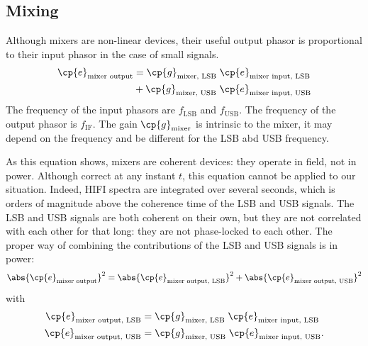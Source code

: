 
\subsection{Mixing}
Although mixers are non-linear devices, their useful output phasor is proportional to their input phasor in the case of small signals.
\begin{equation}
    \begin{aligned}
    \cp{e}_\text{mixer output}
    &=
    \cp{g}_\text{mixer, LSB} \;
    \cp{e}_\text{mixer input, LSB} \\
    &+
    \cp{g}_\text{mixer, USB} \;
    \cp{e}_\text{mixer input, USB}
    \end{aligned}
\end{equation}
The frequency of the input phasors are $f_\text{LSB}$ and $f_\text{USB}$.
The frequency of the output phasor is $f_\text{IF}$.
The gain $\cp{g}_\text{mixer}$ is intrinsic to the mixer, it may depend on the frequency and be different for the LSB abd USB frequency.

As this equation shows, mixers are coherent devices: they operate in field, not in power.
Although correct at any instant $t$, this equation cannot be applied to our situation.
Indeed, HIFI spectra are integrated over several seconds, which is orders of magnitude above the coherence time of the LSB and USB signals.
The LSB and USB signals are both coherent on their own, but they are not correlated with each other for that long: they are not phase-locked to each other.
The proper way of combining the contributions of the LSB and USB signals is in power:
\begin{equation}
    \abs{\cp{e}_\text{mixer output}}^2
    =
    \abs{\cp{e}_\text{mixer output, LSB}}^2
    +
    \abs{\cp{e}_\text{mixer output, USB}}^2
\end{equation}
with
\begin{align}
    \cp{e}_\text{mixer output, LSB}
    &=
    \cp{g}_\text{mixer, LSB}
    \;
    \cp{e}_\text{mixer input, LSB}
    \\
    \cp{e}_\text{mixer output, USB}
    &=
    \cp{g}_\text{mixer, USB}
    \;
    \cp{e}_\text{mixer input, USB}
    \text{.}
\end{align}

